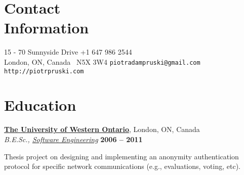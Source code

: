 \documentclass[margin,line]{resume}
\begin{document}
\begin{resume}

\section{\mysidestyle Contact\\Information}

	15 - 70 Sunnyside Drive				\hfill +1 647 986 2544				\vspace{0mm}\\\vspace{0mm}
	\hspace*{-1.0mm}London, ON, Canada~ N5X 3W4	\hfill \texttt{piotradampruski@gmail.com}	\vspace{0mm}\\\vspace{0mm}
							\hfill \texttt{http://piotrpruski.com}		\vspace{0mm}\\\vspace{-4.5mm}



\section{\mysidestyle Education}

	\textbf{\href{http://www.uwo.ca/}{The University of Western Ontario}}, London, ON, Canada	\vspace{2mm}\\\vspace{1mm}
	\textsl{B.E.Sc., \href{http://www.eng.uwo.ca/undergraduate/programs/Software.htm}{Software Engineering}}	\hfill \textbf{ 2006 -- 2011}\vspace{-3mm}\\\vspace{-1mm}
	\begin{list2}
		\item Thesis project on designing and implementing an anonymity authentication protocol for specific network communications (e.g., evaluations, voting, etc).
	\end{list2}\vspace{-1.5mm}


\end{resume}
\end{document}
